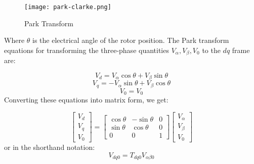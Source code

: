 \begin{figure}[h]
    \centering
    \texttt{[image: park-clarke.png]}
    \caption{Park Transform}
    \label{fig:Park Transform}
\end{figure}

\noindent
Where \( \theta \) is the electrical angle of the rotor position.
\noindent
The Park transform equations for transforming the three-phase quantities \(
V_\alpha, V_\beta, V_0 \) to the \( dq \) frame are:

\begin{equation}
    V_d = V_\alpha \cos \theta + V_\beta \sin \theta
\end{equation}
\begin{equation}
    V_q = -V_\alpha \sin \theta + V_\beta \cos \theta
\end{equation}
\begin{equation}
    V_0 = V_0
\end{equation}
\noindent
Converting these equations into matrix form, we get:

\begin{equation}
    \begin{bmatrix}
        V_d \\
        V_q \\
        V_0
    \end{bmatrix}
    =
    \begin{bmatrix}
        \cos \theta & -\sin \theta & 0 \\
        \sin \theta & \cos \theta  & 0 \\
        0           & 0            & 1
    \end{bmatrix}
    \begin{bmatrix}
        V_\alpha \\
        V_\beta  \\
        V_0
    \end{bmatrix}
\end{equation}
or in the shorthand notation:
\begin{equation}
    V_{dq0} = T_{dq0} V_{\alpha\beta0}
\end{equation}

